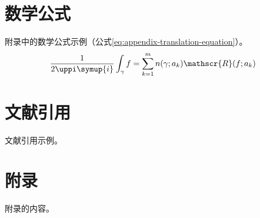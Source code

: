 \begin{translation}
\section{数学公式}

附录中的数学公式示例（公式\eqref{eq:appendix-translation-equation}）。
\begin{equation}
  \frac{1}{2 \uppi \symup{i}} \int_\gamma f = \sum_{k=1}^m n(\gamma; a_k) \mathscr{R}(f; a_k)
  \label{eq:appendix-translation-equation}
\end{equation}


\section{文献引用}

文献引用示例\cite{abrahams99tex}。


\appendix

\section{附录}

附录的内容。





\begin{translation-index}
  \nocite{salomon1995advanced}
  
  
\end{translation-index}

\end{translation}
